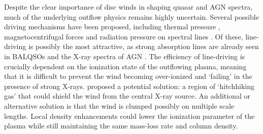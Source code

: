 \documentclass[useAMS,usenatbib]{mn2e_x}
\begin{document}

Despite the clear importance of disc winds in shaping quasar and AGN spectra,  
much of the underlying outflow physics remains highly uncertain. 
Several possible driving mechanisms have been proposed, including
thermal pressure \citep{weymann1982, begelman1991}, magnetocentrifugal forces 
\citep{blandfordpayne,pelletier_pudritz} and 
radiation pressure on spectral lines \citep[`line-driving';][]{lucysolomon1970,shlosman1985,MCGV95}.
Of these, line-driving is possibly the most attractive, as
strong absorption lines are already seen in BALQSOs and the X-ray spectra of AGN 
\citep{reeves2003,poundsreeves2009,tombesi2010a}.
The efficiency of line-driving is crucially dependent on the ionization state 
of the outflowing plasma, meaning that it is difficult to prevent 
the wind becoming over-ionized and `failing' in the presence of strong X-rays. 
\cite{MCGV95} proposed a potential solution: 
a region of `hitchhiking gas' that could shield the wind from the central X-ray source. 
An additional or alternative solution is that the wind is clumped \citep[e.g.][]{hamann2013}
possibly on multiple scale lengths. Local density enhancements could lower the 
ionization parameter of the plasma while still maintaining the same mass-loss 
rate and column density. 
\end{document}
